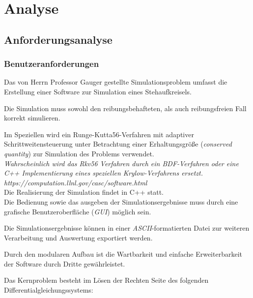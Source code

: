 \chapter{Analyse}
\label{ch:2}

\section{Anforderungsanalyse}
\label{sec:2.1}

\subsection{Benutzeranforderungen}

{Das von Herrn Professor Gauger gestellte Simulationsproblem umfasst die Erstellung einer Software zur Simulation eines Stehaufkreisels.

Die Simulation muss sowohl den reibungsbehafteten, als auch reibungsfreien Fall korrekt simulieren.

Im Speziellen wird ein Runge-Kutta56-Verfahren mit adaptiver Schrittweitensteuerung unter Betrachtung einer Erhaltungsgr\"o\ss e (\textit{conserved quantity}) zur Simulation des Problems verwendet.\\ 
\textit{Wahrscheinlich wird das Rkv56 Verfahren durch ein BDF-Verfahren oder eine C++ Implementierung eines speziellen Krylow-Verfahrens ersetzt.\\
https://computation.llnl.gov/casc/software.html } \\ 
Die Realisierung der Simulation findet in C++ statt. \\

Die Bedienung sowie das ausgeben der Simulationsergebnisse muss durch eine grafische Benutzeroberfl\"ache (\textit{GUI}) m\"oglich sein.

Die Simulationsergebnisse k\"onnen in einer \textit{ASCII}-formatierten Datei zur weiteren Verarbeitung und Auswertung exportiert werden.

Durch den modularen Aufbau ist die Wartbarkeit und einfache Erweiterbarkeit der Software durch Dritte gew\"ahrleistet.
 

Das Kernproblem besteht im L\"osen der Rechten Seite des folgenden Differentialgleichungssystems:

}
